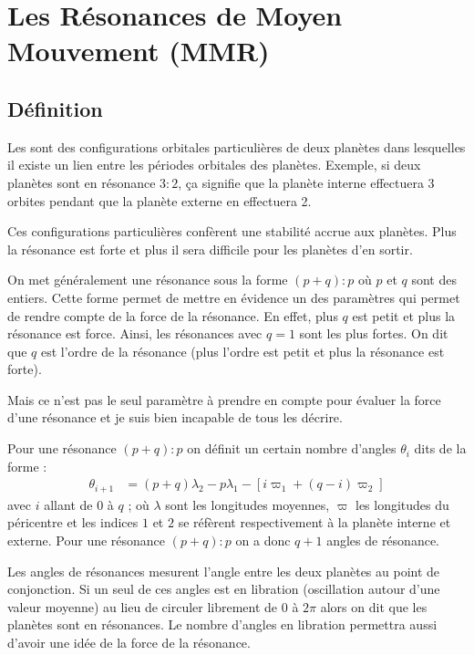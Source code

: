 \section{Les Résonances de Moyen Mouvement (MMR)}
\subsection{Définition}
Les  sont des configurations orbitales particulières de deux planètes dans lesquelles il existe un lien entre les périodes orbitales des planètes. Exemple, si deux planètes sont en résonance $3:2$, ça signifie que la planète interne effectuera 3 orbites pendant que la planète externe en effectuera 2.

Ces configurations particulières confèrent une stabilité accrue aux planètes. Plus la résonance est forte et plus il sera difficile pour les planètes d'en sortir.

\bigskip

On met généralement une résonance sous la forme $(p+q):p$ où $p$ et $q$ sont des entiers. Cette forme permet de mettre en évidence un des paramètres qui permet de rendre compte de la force de la résonance. En effet, plus $q$ est petit et plus la résonance est force. Ainsi, les résonances avec $q=1$ sont les plus fortes. On dit que $q$ est l'ordre de la résonance (plus l'ordre est petit et plus la résonance est forte).

\begin{attention}
Mais ce n'est pas le seul paramètre à prendre en compte pour évaluer la force d'une résonance et je suis bien incapable de tous les décrire.
\end{attention}

Pour une résonance $(p+q):p$ on définit un certain nombre d'angles $\theta_i$ dits  de la forme :
\begin{align}
\theta_{i+1} &=(p+q)\lambda_2 -p\lambda_1 - \left[i\varpi_{1} + (q-i)\varpi_2\right]
\end{align}
avec $i$ allant de $0$ à $q$ ; où $\lambda$ sont les longitudes moyennes, $\varpi$ les longitudes du péricentre et les indices $1$ et $2$ se réfèrent respectivement à la planète interne et externe. Pour une résonance $(p+q):p$ on a donc $q+1$ angles de résonance.

Les angles de résonances mesurent l'angle entre les deux planètes au point de conjonction. Si un seul de ces angles est en libration (oscillation autour d'une valeur moyenne) au lieu de circuler librement de $0$ à $2\pi$ alors on dit que les planètes sont en résonances. Le nombre d'angles en libration permettra aussi d'avoir une idée de la force de la résonance.


